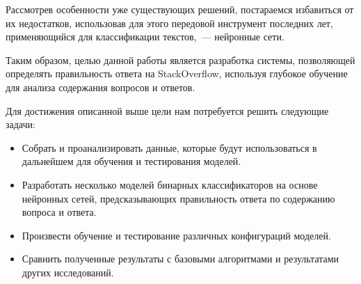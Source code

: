 \documentclass[../diploma.tex]{subfiles}
\begin{document}
	\label{sec:goals}

    Рассмотрев особенности уже существующих решений, постараемся избавиться от их недостатков, использовав для этого передовой инструмент последних лет, 
	применяющийся для классификации текстов,~--- нейронные сети.

	Таким образом, целью данной работы является разработка системы, позволяющей определять правильность ответа на StackOverflow, 
	используя глубокое обучение для анализа содержания вопросов и ответов.
	
	Для достижения описанной выше цели нам потребуется решить следующие задачи:

	\begin{itemize}

		\item
		Собрать и проанализировать данные, которые будут использоваться в дальнейшем для обучения и тестирования моделей.
		
		\item
		Разработать несколько моделей бинарных классификаторов на основе нейронных сетей, предсказывающих правильность ответа по содержанию вопроса и ответа.

		\item
		Произвести обучение и тестирование различных конфигураций моделей. 

		\item
		Сравнить полученные результаты с базовыми алгоритмами и результатами других исследований.


	\end{itemize}
\end{document}
